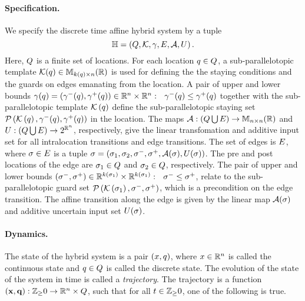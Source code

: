\paragraph{Specification.}
We specify the discrete time affine hybrid system by a tuple 
%
\[
\mathbb{H} =
\left(Q,\mathcal{K},\gamma,E,\mathcal{A},U\right).
\]
%
Here, $Q$ is a finite set of locations.  For each location
$q\in Q$, a sub-parallelotopic template
$\mathcal{K}(q)\in\mathbb{M}_{k(q)\times n}(\mathbb{\mathbb{R}})$ is used for defining the
the staying conditions and the guards on edges emanating from the
location.  A pair of upper and lower bounds
$\gamma(q)=\left(\gamma^-(q),\gamma^+(q)\right)\in\mathbb{R}^n\times\mathbb{R}^n:
~~\gamma^-(q)\leq\gamma^+(q)$ together with the sub-parallelotopic
template $\mathcal{K}\left(q\right)$ define the
sub-parallelotopic staying set
$\mathcal{P}\left(\mathcal{K}\left(q\right),\gamma^-(q),\gamma^+(q)\right)$ in the
location.  The maps
$\mathcal{A}:\left(Q\bigcup E\right)\rightarrow\mathbb{M}_{n\times n}(\mathbb{R})$
and $U:\left(Q\bigcup E\right)\rightarrow 2^{\mathbb{R}^n}$,
respectively, give the linear transfomation and additive input set for
all intralocation transitions and edge transitions.  The set of edges
is $E$, where $\sigma\in E$ is a tuple $\sigma =
\left(\sigma_{1},\sigma_{2},\sigma^-,\sigma^+,\mathcal{A}(\sigma),U(\sigma)\right)$.  The pre and post locations of the edge are
$\sigma_{1}\in Q$ and $\sigma_{2}\in Q$,
respectively.  The pair of upper and lower bounds
$\left(\sigma^-,\sigma^+\right)\in\mathbb{R}^{k\left(\sigma_{1}\right)}\times\mathbb{R}^{k\left(\sigma_{1}\right)}:~~\sigma^-\leq\sigma^+$,
relate to the sub-parallelotopic guard set
$\mathcal{P}\left(\mathcal{K}\left(\sigma_{1}\right),\sigma^-,\sigma^+\right)$, which
is a precondition on the edge transition.  The affine transition along
the edge is given by the linear map $\mathcal{A}(\sigma)$ and additive
uncertain input set $U(\sigma)$.

\paragraph{Dynamics.}
The state of the hybrid system is a pair $(x,q)$, where
$x\in\mathbb{R}^n$ is called the continuous state and
$q\in Q$ is called the discrete state.  The
evolution of the state of the system in time is called a
\emph{trajectory}.  The trajectory is a function
$\left({\bf x},{\bf q}\right):\mathbb{Z}_\geq 0\rightarrow\mathbb{R}^n\times Q$, such
that for all $t\in\mathbb{Z}_\geq 0$, one of the following is true.

